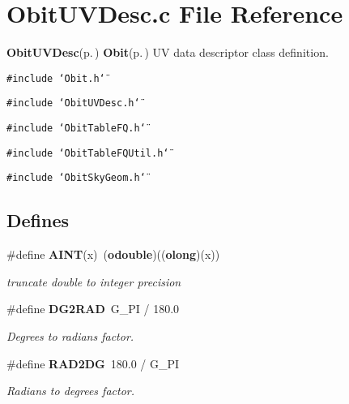 \section{Obit\-UVDesc.c File Reference}
\label{ObitUVDesc_8c}
{\bf Obit\-UVDesc}{\rm (p.\,\pageref{structObitUVDesc})} {\bf Obit}{\rm (p.\,\pageref{structObit})} UV data descriptor class definition. 

{\tt \#include \char`\"{}Obit.h\char`\"{}}\par
{\tt \#include \char`\"{}Obit\-UVDesc.h\char`\"{}}\par
{\tt \#include \char`\"{}Obit\-Table\-FQ.h\char`\"{}}\par
{\tt \#include \char`\"{}Obit\-Table\-FQUtil.h\char`\"{}}\par
{\tt \#include \char`\"{}Obit\-Sky\-Geom.h\char`\"{}}\par
\subsection*{Defines}
\begin{CompactItemize}
\item 
\#define {\bf AINT}(x)\ ({\bf odouble})(({\bf olong})(x))
\begin{CompactList}\small\item\em truncate double to integer precision \item\end{CompactList}\item 
\#define {\bf DG2RAD}\ G\_\-PI / 180.0
\begin{CompactList}\small\item\em Degrees to radians factor. \item\end{CompactList}\item 
\#define {\bf RAD2DG}\ 180.0 / G\_\-PI
\begin{CompactList}\small\item\em Radians to degrees factor. \item\end{CompactList}\end{CompactItemize}

